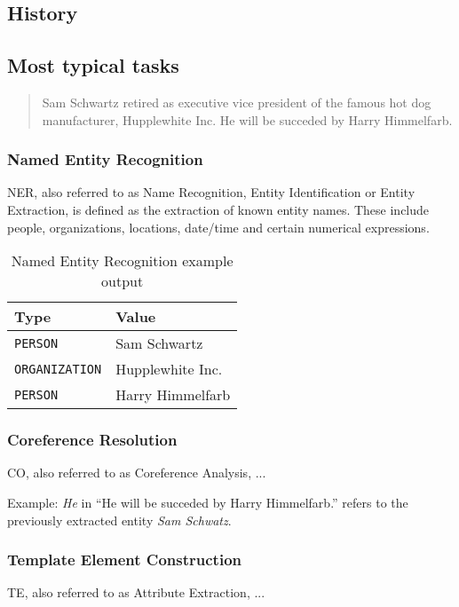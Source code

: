 \newpage
\subsection{History}

\newpage
\subsection{Most typical tasks}


\begin{quote}
Sam Schwartz retired as executive vice president of the famous hot dog manufacturer, Hupplewhite Inc. He will be succeded by Harry Himmelfarb.
\cite{Grishman:1997}
\end{quote}

\subsubsection{Named Entity Recognition}
\gls{NER}, also referred to as Name Recognition, Entity Identification or Entity Extraction, is defined as the extraction of known entity names. These include people, organizations, locations, date/time and certain numerical expressions. 

\begin{table}[H]
\centering
\begin{tabular*}{\textwidth}{ l  l }
	\toprule
	\textbf{Type} & \textbf{Value} \\
	\midrule
	\texttt{PERSON} & Sam Schwartz \\
	\texttt{ORGANIZATION} & Hupplewhite Inc. \\
	\texttt{PERSON} & Harry Himmelfarb \\
	\bottomrule
\end{tabular*}
\caption{Named Entity Recognition example output}
\end{table}

\subsubsection{Coreference Resolution}
\gls{CO}, also referred to as Coreference Analysis, ...

Example: \textit{He} in \enquote{He will be succeded by Harry Himmelfarb.} refers to the previously extracted entity \textit{Sam Schwatz}.

\subsubsection{Template Element Construction}
\gls{TE}, also referred to as Attribute Extraction, ...

